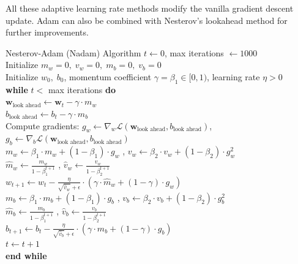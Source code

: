 All these adaptive learning rate methods modify the vanilla gradient descent update. Adam can also be combined with Nesterov's lookahead method for further improvements.

\begin{algobox}{Nesterov-Adam (Nadam) Algorithm}
\( t \gets 0 \), \quad max iterations \( \gets 1000 \) \\
Initialize \( m_w = 0, \; v_w = 0, \; m_b = 0, \; v_b = 0 \) \\
Initialize \( w_0, \; b_0 \), \quad momentum coefficient \( \gamma = \beta_1 \in [0,1) \), \quad learning rate \( \eta > 0 \) \\
\textbf{while} \( t < \) max iterations \textbf{do} \\
\hspace*{1em} \( \mathbf{w}_{\text{look ahead}} \gets \mathbf{w}_t - \gamma \cdot m_w \) \\
\hspace*{1em} \( b_{\text{look ahead}} \gets b_t - \gamma \cdot m_b \) \\
\hspace*{1em} Compute gradients: \( g_w \gets \nabla_w \mathcal{L}(\mathbf{w}_{\text{look ahead}}, b_{\text{look ahead}}) \), \quad \( g_b \gets \nabla_b \mathcal{L}(\mathbf{w}_{\text{look ahead}}, b_{\text{look ahead}}) \) \\

\hspace*{1em} \( m_w \gets \beta_1 \cdot m_w + (1 - \beta_1) \cdot g_w \) , \quad \( v_w \gets \beta_2 \cdot v_w + (1 - \beta_2) \cdot g_w^2 \) \\
\hspace*{1em} \( \hat{m}_w \gets \frac{m_w}{1 - \beta_1^{t+1}} \) , \quad \( \hat{v}_w \gets \frac{v_w}{1 - \beta_2^{t+1}} \) \\
\hspace*{1em} \( w_{t+1} \gets w_t - \frac{\eta}{\sqrt{\hat{v}_w} + \epsilon} \cdot (\gamma \cdot \hat{m}_w + (1 - \gamma) \cdot g_w) \) \\

\hspace*{1em} \( m_b \gets \beta_1 \cdot m_b + (1 - \beta_1) \cdot g_b \) , \quad \( v_b \gets \beta_2 \cdot v_b + (1 - \beta_2) \cdot g_b^2 \) \\
\hspace*{1em} \( \hat{m}_b \gets \frac{m_b}{1 - \beta_1^{t+1}} \) , \quad \( \hat{v}_b \gets \frac{v_b}{1 - \beta_2^{t+1}} \) \\
\hspace*{1em} \( b_{t+1} \gets b_t - \frac{\eta}{\sqrt{\hat{v}_b} + \epsilon} \cdot (\gamma \cdot \hat{m}_b + (1 - \gamma) \cdot g_b) \) \\
\hspace*{1em} \( t \gets t + 1 \) \\
\textbf{end while}
\end{algobox}


